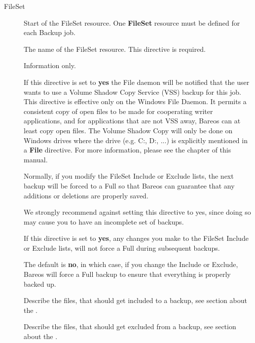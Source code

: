 \begin{description}

\item [FileSet]
Start of the FileSet resource. One {\bf FileSet}  resource must be
defined for each Backup job.

    The name of the FileSet resource.  This directive is required.

    Information only.

  If this directive is set to {\bf yes} the File daemon will be notified
  that the user wants to use a Volume Shadow Copy Service (VSS) backup
  for this job. This directive is effective only on the Windows File Daemon.
  It permits a consistent copy
  of open files to be made for cooperating writer applications, and for
  applications that are not VSS away, Bareos can at least copy open files.
  The Volume Shadow Copy will only be done on Windows drives where the
  drive (e.g. C:, D:, ...) is explicitly mentioned in a {\bf File}
  directive.
  For more information, please see the
   chapter of this manual.


   Normally, if you modify the FileSet Include or Exclude lists,
   the next backup will be forced to a Full so that Bareos can
   guarantee that any additions or deletions are properly saved.

   We strongly recommend against setting this directive to yes,
   since doing so may cause you to have an incomplete set of backups.

   If this directive is set to {\bf yes}, any changes you make to the
   FileSet Include or Exclude lists, will not force a Full during
   subsequent backups.

   The default is {\bf no}, in which case, if you change the Include or
   Exclude, Bareos will force a Full backup to ensure that everything is
   properly backed up.

    Describe the files, that should get included to a backup, see section about the .

    Describe the files, that should get excluded from a backup, see section about the .

\end{description}


